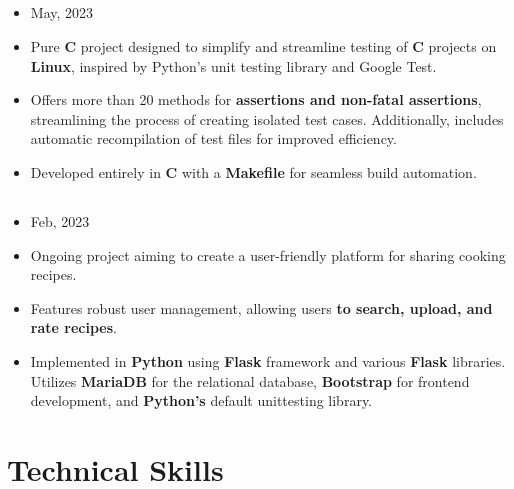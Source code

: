 \documentclass[11pt]{article}
\begin{document}
\subsection*{\href{https://github.com/alecksandr26/unittest-c}{\color{blue}{Unit Testing Framework for C in Linux:}}}
\vspace{-0.3cm}
\begin{itemize}[noitemsep, nolistsep]
\item May, 2023
\item Pure \textbf{C} project designed to simplify and streamline testing of \textbf{C} projects on
  \textbf{Linux}, inspired by Python's unit testing library and Google Test.
\item Offers more than 20 methods for \textbf{assertions and non-fatal assertions}, streamlining the
  process of creating isolated test cases. Additionally, includes automatic recompilation of test files
  for improved efficiency.
\item Developed entirely in \textbf{C} with a \textbf{Makefile} for seamless build automation.
\end{itemize}
\vspace{-0.3cm}
\subsection*{\href{https://github.com/alecksandr26/recipe-app-web}{\color{blue}{Cooking Recipes Web App:}}}
\vspace{-0.3cm}
\begin{itemize}[noitemsep, nolistsep]
\item Feb, 2023
\item Ongoing project aiming to create a user-friendly platform for sharing cooking recipes.
\item Features robust user management, allowing users \textbf{to search, upload, and rate recipes}.
\item Implemented in \textbf{Python} using \textbf{Flask} framework and various \textbf{Flask} libraries.
  Utilizes \textbf{MariaDB} for the relational database,
  \textbf{Bootstrap} for frontend development, and \textbf{Python's} default unittesting library.
\end{itemize}

\vspace{-0.5cm}
\section*{Technical Skills}
\vspace{-0.3cm}
\titlerule[0.3pt]
\vspace{0.1cm}
\end{document}
